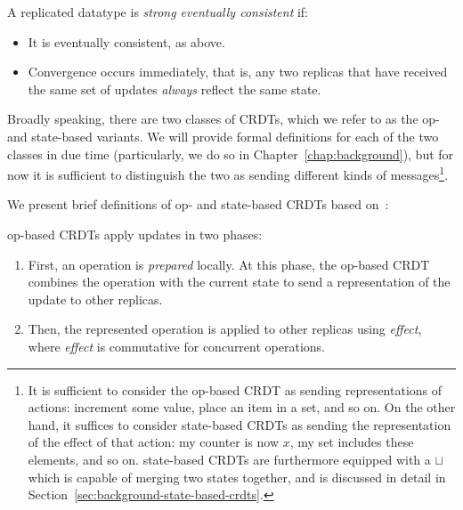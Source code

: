 \begin{definition}
  A replicated datatype is \textit{strong eventually consistent} if:
  \begin{itemize}
    \item It is eventually consistent, as above.
    \item Convergence occurs immediately, that is, any two replicas that have
      received the same set of updates \textit{always} reflect the same state.
  \end{itemize}
\end{definition}

Broadly speaking, there are two classes of CRDTs, which we refer to as the op-
and state-based variants. We will provide formal definitions for each of the two
classes in due time (particularly, we do so in Chapter~\ref{chap:background}),
but for now it is sufficient to distinguish the two as sending different kinds
of messages\footnote{It is sufficient to consider the op-based CRDT as sending
representations of actions: increment some value, place an item in a set, and so
on. On the other hand, it suffices to consider state-based CRDTs as sending the
representation of the effect of that action: my counter is now $x$, my set
includes these elements, and so on. state-based CRDTs are furthermore equipped
with a $\sqcup$ which is capable of merging two states together, and is
discussed in detail in Section~\ref{sec:background-state-based-crdts}.}.

We present brief definitions of op- and state-based CRDTs based
on~\citep{baquero14}:

\begin{definition}
  op-based CRDTs apply updates in two phases:
  \begin{enumerate}
    \item First, an operation is \textit{prepared} locally. At this phase, the
      op-based CRDT combines the operation with the current state to send a
      representation of the update to other replicas.
    \item Then, the represented operation is applied to other replicas using
      \textit{effect}, where \textit{effect} is commutative for concurrent
      operations.
  \end{enumerate}
\end{definition}

